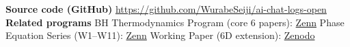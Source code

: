 \documentclass[9pt,a4paper]{article}
\begin{document}
\vspace{3pt}
{\footnotesize\textbf{Source code (GitHub)}\enspace
\url{https://github.com/WurabeSeiji/ai-chat-logs-open}\\[1pt]
\textbf{Related programs}\enspace
BH Thermodynamics Program (core 6 papers): \href{https://zenn.dev/noriaki_kihara/articles/bh-thermodynamics-projection}{Zenn}\enspace
Phase Equation Series (W1--W11): \href{https://zenn.dev/noriaki_kihara/articles/phase-equation-hypercube-particle-classification}{Zenn}\enspace
Working Paper (6D extension): \href{https://doi.org/10.5281/zenodo.19902677}{Zenodo}}
\end{document}
